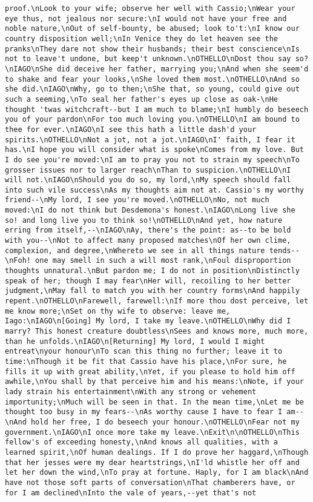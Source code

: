 \begin{verbatim}
proof.\nLook to your wife; observe her well with Cassio;\nWear your eye thus, not jealous nor secure:\nI would not have your free and noble nature,\nOut of self-bounty, be abused; look to't:\nI know our country disposition well;\nIn Venice they do let heaven see the pranks\nThey dare not show their husbands; their best conscience\nIs not to leave't undone, but keep't unknown.\nOTHELLO\nDost thou say so?\nIAGO\nShe did deceive her father, marrying you;\nAnd when she seem'd to shake and fear your looks,\nShe loved them most.\nOTHELLO\nAnd so she did.\nIAGO\nWhy, go to then;\nShe that, so young, could give out such a seeming,\nTo seal her father's eyes up close as oak-\nHe thought 'twas witchcraft--but I am much to blame;\nI humbly do beseech you of your pardon\nFor too much loving you.\nOTHELLO\nI am bound to thee for ever.\nIAGO\nI see this hath a little dash'd your spirits.\nOTHELLO\nNot a jot, not a jot.\nIAGO\nI' faith, I fear it has.\nI hope you will consider what is spoke\nComes from my love. But I do see you're moved:\nI am to pray you not to strain my speech\nTo grosser issues nor to larger reach\nThan to suspicion.\nOTHELLO\nI will not.\nIAGO\nShould you do so, my lord,\nMy speech should fall into such vile success\nAs my thoughts aim not at. Cassio's my worthy friend--\nMy lord, I see you're moved.\nOTHELLO\nNo, not much moved:\nI do not think but Desdemona's honest.\nIAGO\nLong live she so! and long live you to think so!\nOTHELLO\nAnd yet, how nature erring from itself,--\nIAGO\nAy, there's the point: as--to be bold with you--\nNot to affect many proposed matches\nOf her own clime, complexion, and degree,\nWhereto we see in all things nature tends--\nFoh! one may smell in such a will most rank,\nFoul disproportion thoughts unnatural.\nBut pardon me; I do not in position\nDistinctly speak of her; though I may fear\nHer will, recoiling to her better judgment,\nMay fall to match you with her country forms\nAnd happily repent.\nOTHELLO\nFarewell, farewell:\nIf more thou dost perceive, let me know more;\nSet on thy wife to observe: leave me, Iago:\nIAGO\n[Going] My lord, I take my leave.\nOTHELLO\nWhy did I marry? This honest creature doubtless\nSees and knows more, much more, than he unfolds.\nIAGO\n[Returning] My lord, I would I might entreat\nyour honour\nTo scan this thing no further; leave it to time:\nThough it be fit that Cassio have his place,\nFor sure, he fills it up with great ability,\nYet, if you please to hold him off awhile,\nYou shall by that perceive him and his means:\nNote, if your lady strain his entertainment\nWith any strong or vehement importunity;\nMuch will be seen in that. In the mean time,\nLet me be thought too busy in my fears--\nAs worthy cause I have to fear I am--\nAnd hold her free, I do beseech your honour.\nOTHELLO\nFear not my government.\nIAGO\nI once more take my leave.\nExit\n\nOTHELLO\nThis fellow's of exceeding honesty,\nAnd knows all qualities, with a learned spirit,\nOf human dealings. If I do prove her haggard,\nThough that her jesses were my dear heartstrings,\nI'ld whistle her off and let her down the wind,\nTo pray at fortune. Haply, for I am black\nAnd have not those soft parts of conversation\nThat chamberers have, or for I am declined\nInto the vale of years,--yet that's not 
\end{verbatim}
